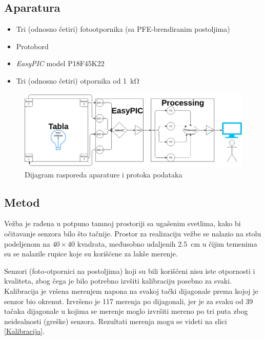 \documentclass{article}
\begin{document}
\subsection{Aparatura}
    \begin{itemize}
        \item Tri (odnosno četiri) fotootpornika (sa PFE-brendiranim postoljima)
        \item Protobord
        \item \textit{EasyPIC} model P18F45K22
        \item Tri (odnosno četiri) otpornika od \SI{1}{\kilo\ohm} %
    \end{itemize}
    \begin{figure}[H]
        \centering
        \includegraphics[scale=0.3]{dijagram.png}
        \caption{Dijagram rasporeda aparature i protoka podataka}
        \label{Dijagram}
    \end{figure}

\subsection{Metod}
    Vežba je rađena u potpuno tamnoj prostoriji sa ugašenim svetlima, kako bi očitavanje senzora bilo što tačnije. Prostor za realizaciju vežbe se nalazio na stolu podeljenom na $40\times40$ kvadrata, međusobno udaljenih \SI{2.5}{\cm} u čijim temenima su se nalazile rupice koje su korišćene za lakše merenje.

    Senzori (foto-otpornici na postoljima) koji su bili korišćeni nisu iste otpornosti i kvaliteta, zbog čega je bilo potrebno izvšiti kalibraciju posebno za svaki. Kalibracija je vršena merenjem napona na svakoj tački dijagonale prema kojoj je senzor bio okrenut. Izvršeno je 117 merenja po dijagonali, jer je za svaku od 39 tačaka dijagonale u kojima se merenje moglo izvršiti mereno po tri puta zbog neidealnosti (greške) senzora. Rezultati merenja mogu se videti na slici \ref{Kalibracija}.
\end{document}
